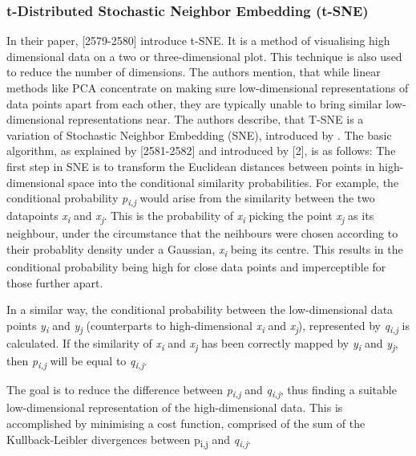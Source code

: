 \subsubsection{t-Distributed Stochastic Neighbor Embedding (t-SNE)}
In their paper, \textcite{maaten2008visualizing}[2579-2580] introduce t-SNE. It is a method of visualising high dimensional data on a two or three-dimensional plot. This technique is also used to reduce the number of dimensions. The authors mention, that while linear methods like PCA concentrate on making sure low-dimensional representations of data points apart from each other, they are typically unable to bring similar low-dimensional representations near.
The authors describe, that T-SNE is a variation of Stochastic Neighbor Embedding (SNE), introduced by \textcite{hinton2003stochastic}. 
The basic algorithm, as explained by \textcite{maaten2008visualizing}[2581-2582] and introduced by \textcite{hinton2003stochastic}[2], is as follows:
The first step in SNE is to transform the Euclidean distances between points in high-dimensional space into the conditional similarity probabilities. For example, the conditional probability \textit{p\textsubscript{i,j}} would arise from the similarity between the two datapoints \textit{x\textsubscript{i}} and \textit{x\textsubscript{j}}. This is the probability of \textit{x\textsubscript{i}} picking the point \textit{x\textsubscript{j}} as its neighbour, under the circumstance that the neihbours were chosen according to their probablity density under a Gaussian, \textit{x\textsubscript{i}} being its centre.
This results in the conditional probability being high for close data points and imperceptible for those further apart.

In a similar way, the conditional probability between the low-dimensional data points \textit{y\textsubscript{i}} and \textit{y\textsubscript{j}} (counterparts to high-dimensional \textit{x\textsubscript{i}} and \textit{x\textsubscript{j}}), represented by \textit{q\textsubscript{i,j}} is calculated. If the similarity of \textit{x\textsubscript{i}} and \textit{x\textsubscript{j}} has been correctly mapped by \textit{y\textsubscript{i}} and \textit{y\textsubscript{j}}, then \textit{p\textsubscript{i,j}} will be equal to \textit{q\textsubscript{i,j}}. 

The goal is to reduce the difference between \textit{p\textsubscript{i,j}} and \textit{q\textsubscript{i,j}}, thus finding a suitable low-dimensional representation of the high-dimensional data. This is accomplished by minimising a cost function, comprised of the sum of the Kullback-Leibler divergences between {p\textsubscript{i,j}} and \textit{q\textsubscript{i,j}}. 

